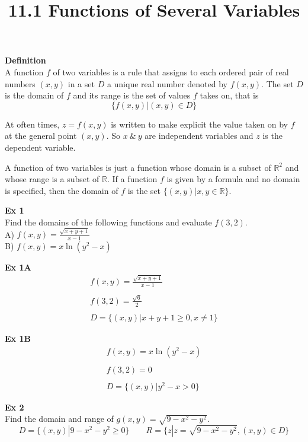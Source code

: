 \documentclass{article}
\title{11.1 Functions of Several Variables}
\begin{document}
    \maketitle
    \textbf{Definition}\\
    A function $ f $ of two variables is a rule that assigns to each ordered pair of real numbers $ (x,y) $ in a set $ D $ a unique real number denoted by $ f(x,y) $. The set $ D $ is the domain of $ f $ and its range is the set of values $ f $ takes on, that is
    \[
      \{ f(x,y) | (x,y) \in D \} 
    \]

    At often times, $ z=f(x,y) $ is written to make explicit the value taken on by $ f $ at the general point $ (x,y) $. So $ x ~\&~ y $ are independent variables and $ z $ is the dependent variable.

    A function of two variables is just a function whose domain is a subset of $ \mathbb{R}^{2}  $ and whose range is a subset of $ \mathbb{R} $. If a function $ f $ is given by a formula and no domain is specified, then the domain of $ f $ is the set $ \{ (x,y)|x,y \in \mathbb{R} \} $.

  \textbf{Ex 1}\\
  Find the domains of the following functions and evaluate $ f(3,2) $.\\
  A) $ f(x,y)=\frac{\sqrt{x+y+1}}{x-1}$\\
  B) $ f(x,y) =x\ln(y^{2}-x) $ 

  \textbf{Ex 1A}
  \[
      \begin{gathered}
      f(x,y)=\frac{\sqrt{x+y+1}}{x-1}\\
      ~\\
      f(3,2)=\frac{\sqrt{6}}{2}\\
      ~\\ 
      D=\{ (x,y) | x+y+1\ge 0,x \neq 1\}
      \end{gathered}
  \]

  \textbf{Ex 1B}
  \[
      \begin{gathered}
      f(x,y)=x\ln(y^{2}-x)\\
      ~\\
      f(3,2)=0\\
      ~\\
      D=\{ (x,y)|y^{2}-x>0\}
      \end{gathered}
  \]

  \textbf{Ex 2}\\
  Find the domain and range of $ g(x,y)=\sqrt{9-x^{2}-y^{2}}$.
  \[
      D=\{ (x,y)|9-x^{2}-y^{2}\ge0\} \qquad R=\{ z|z=\sqrt{9-x^{2} -y^{2} },(x,y) \in D \}
  \]
\end{document}
